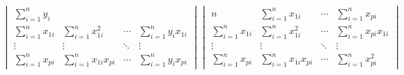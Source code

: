 \documentclass[dvipdfmx]{jsarticle}
\begin{document}
\begin{equation}
\begin{array}{c}
{\begin{vmatrix}
        \displaystyle
        \sum_{i=1}^n y_i            \\
        \displaystyle
        \sum_{i=1}^n x_{1i}       &
        \displaystyle
        \sum_{i=1}^n x_{1i}^2     &
        \displaystyle
        \cdots                    &
        \displaystyle
        \sum_{i=1}^n y_ix_{1i}      \\
        \vdots                    &
        \vdots                    &
        \ddots                    &
        \vdots                      \\
        \displaystyle
        \sum_{i=1}^n x_{pi}       &
        \displaystyle
        \sum_{i=1}^n x_{1i}x_{pi} &
        \displaystyle
        \cdots                    &
        \displaystyle
        \sum_{i=1}^n y_ix_{pi}
      \end{vmatrix}
    }{
      \begin{vmatrix}
        \displaystyle
        n                         &
        \displaystyle
        \sum_{i=1}^n x_{1i}       &
        \displaystyle
        \cdots                    &
        \displaystyle
        \sum_{i=1}^n x_{pi}         \\
        \displaystyle
        \sum_{i=1}^n x_{1i}       &
        \displaystyle
        \sum_{i=1}^n x_{1i}^2     &
        \displaystyle
        \cdots                    &
        \displaystyle
        \sum_{i=1}^n x_{pi}x_{1i}   \\
        \vdots                    &
        \vdots                    &
        \ddots                    &
        \vdots                      \\
        \displaystyle
        \sum_{i=1}^n x_{pi}       &
        \displaystyle
        \sum_{i=1}^n x_{1i}x_{pi} &
        \displaystyle
        \cdots                    &
        \displaystyle
        \sum_{i=1}^n x_{pi}^2
      \end{vmatrix}
    }
  \end{array}
\end{equation}
\end{document}
